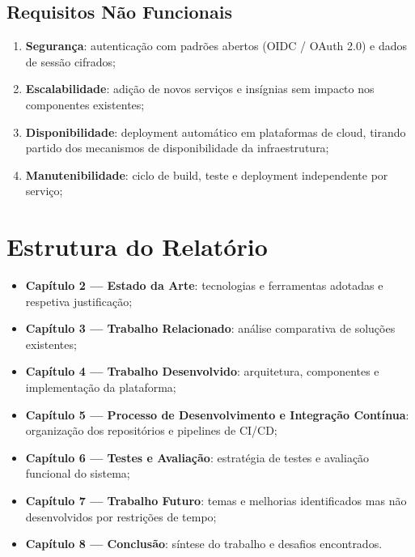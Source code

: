 \subsection{Requisitos Não Funcionais}
\label{sec:1.4.2}

\begin{enumerate}
    \item \textbf{Segurança}: autenticação com padrões abertos (\ac{OIDC} / OAuth 2.0) e dados de sessão cifrados;
    \item \textbf{Escalabilidade}: adição de novos serviços e insígnias sem impacto nos componentes existentes;
    \item \textbf{Disponibilidade}: deployment automático em plataformas de cloud, tirando partido dos mecanismos de disponibilidade da infraestrutura;
    \item \textbf{Manutenibilidade}: ciclo de build, teste e deployment independente por serviço;
\end{enumerate}

\section{Estrutura do Relatório}
\label{sec:1.5}

\begin{itemize}
    \item \textbf{Capítulo 2 — Estado da Arte}: tecnologias e ferramentas adotadas e respetiva justificação;
    \item \textbf{Capítulo 3 — Trabalho Relacionado}: análise comparativa de soluções existentes;
    \item \textbf{Capítulo 4 — Trabalho Desenvolvido}: arquitetura, componentes e implementação da plataforma;
    \item \textbf{Capítulo 5 — Processo de Desenvolvimento e Integração Contínua}: organização dos repositórios e pipelines de \ac{CI/CD};
    \item \textbf{Capítulo 6 — Testes e Avaliação}: estratégia de testes e avaliação funcional do sistema;
    \item \textbf{Capítulo 7 — Trabalho Futuro}: temas e melhorias identificados mas não desenvolvidos por restrições de tempo;
    \item \textbf{Capítulo 8 — Conclusão}: síntese do trabalho e desafios encontrados.
\end{itemize}
